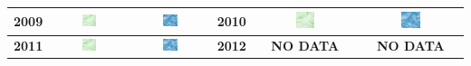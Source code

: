 \begin{longtable}{|c|c|c|c|c|c|}
    \textbf{2009} & \includegraphics[width=0.2\textwidth]{img_sat/NDVI_2009.png} & \includegraphics[width=0.2\textwidth]{img_sat/NSI_2009.png} &
    \textbf{2010} & \includegraphics[width=0.2\textwidth]{img_sat/NDVI_2010.png} & \includegraphics[width=0.2\textwidth]{img_sat/NSI_2010.png} \\
    \hline
    

    \textbf{2011} & \includegraphics[width=0.2\textwidth]{img_sat/NDVI_2011.png} & \includegraphics[width=0.2\textwidth]{img_sat/NSI_2011.png} &
    \textbf{2012} & \textbf{NO DATA} & \textbf{NO DATA} \\
    \hline
    


\end{longtable}
